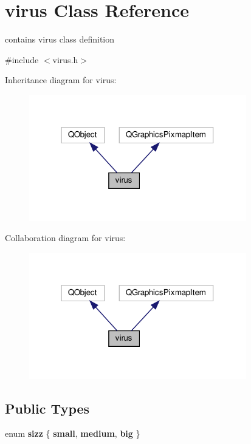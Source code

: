 \hypertarget{classvirus}{}\section{virus Class Reference}
\label{classvirus}


contains virus class definition  




{\ttfamily \#include $<$virus.\+h$>$}



Inheritance diagram for virus\+:\nopagebreak
\begin{figure}[H]
\begin{center}
\leavevmode
\includegraphics[width=268pt]{classvirus__inherit__graph}
\end{center}
\end{figure}


Collaboration diagram for virus\+:\nopagebreak
\begin{figure}[H]
\begin{center}
\leavevmode
\includegraphics[width=268pt]{classvirus__coll__graph}
\end{center}
\end{figure}
\subsection*{Public Types}
\begin{DoxyCompactItemize}
\item 
\mbox{\label{classvirus_a6bd2aa8d6e7d98fab2229f660853fb19}} 
enum {\bfseries sizz} \{ {\bfseries small}, 
{\bfseries medium}, 
{\bfseries big}
 \}
\end{DoxyCompactItemize}
